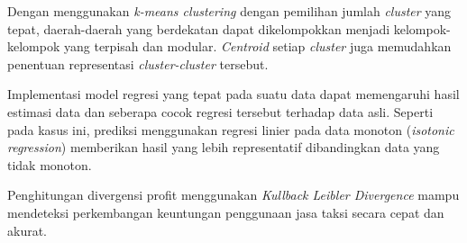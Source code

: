 \documentclass{article}
\begin{document}
Dengan menggunakan \textit{k-means clustering} dengan pemilihan jumlah \textit{cluster} yang tepat, daerah-daerah yang berdekatan dapat dikelompokkan menjadi kelompok-kelompok yang terpisah dan modular. \textit{Centroid} setiap \textit{cluster} juga memudahkan penentuan representasi \textit{cluster-cluster} tersebut.

Implementasi model regresi yang tepat pada suatu data dapat memengaruhi hasil estimasi data dan seberapa cocok regresi tersebut terhadap data asli. Seperti pada kasus ini, prediksi menggunakan regresi linier pada data monoton (\textit{isotonic regression}) memberikan hasil yang lebih representatif dibandingkan data yang tidak monoton.

Penghitungan divergensi profit menggunakan \textit{Kullback Leibler Divergence} mampu mendeteksi perkembangan keuntungan penggunaan jasa taksi secara cepat dan akurat.
\end{document}
